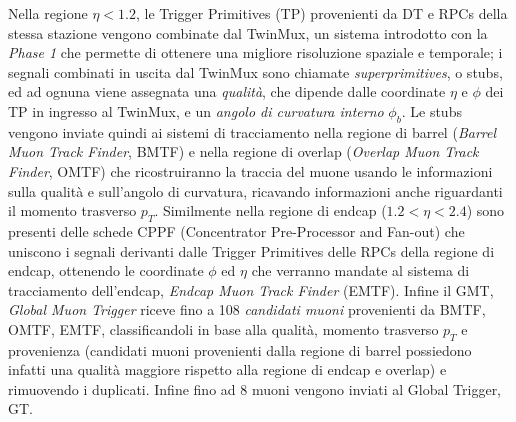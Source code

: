 Nella regione $\eta < 1.2$, le Trigger Primitives (TP) provenienti da DT e RPCs della stessa stazione vengono combinate dal TwinMux, un sistema introdotto con la \textit{Phase 1} che permette di ottenere una migliore risoluzione spaziale e temporale; i segnali combinati in uscita dal TwinMux sono chiamate \textit{superprimitives}, o stubs, ed ad ognuna viene assegnata una \textit{qualità}, che dipende dalle coordinate $\eta$ e $\phi$ dei TP in ingresso al TwinMux, e un \textit{angolo di curvatura interno} $\phi_b$. Le stubs vengono inviate quindi ai sistemi di tracciamento nella regione di barrel (\textit{Barrel Muon Track Finder}, BMTF) e nella regione di overlap (\textit{Overlap Muon Track Finder}, OMTF) che ricostruiranno la traccia del muone usando le informazioni sulla qualità e sull'angolo di curvatura, ricavando informazioni anche riguardanti il momento trasverso $p_T$. \newline
Similmente nella regione di endcap ($1.2 < \eta < 2.4$) sono presenti delle schede CPPF (Concentrator Pre-Processor and Fan-out) che uniscono i segnali derivanti dalle Trigger Primitives delle RPCs della regione di endcap, ottenendo le coordinate $\phi$ ed $\eta$ che verranno mandate al sistema di tracciamento dell'endcap, \textit{Endcap Muon Track Finder} (EMTF). \newline
Infine il GMT, \textit{Global Muon Trigger} riceve fino a 108 \textit{candidati muoni} provenienti da BMTF, OMTF, EMTF, classificandoli in base alla qualità, momento trasverso $p_T$ e provenienza (candidati muoni provenienti dalla regione di barrel possiedono infatti una qualità maggiore rispetto alla regione di endcap e overlap) e rimuovendo i duplicati. Infine fino ad 8 muoni vengono inviati al Global Trigger, GT. 


